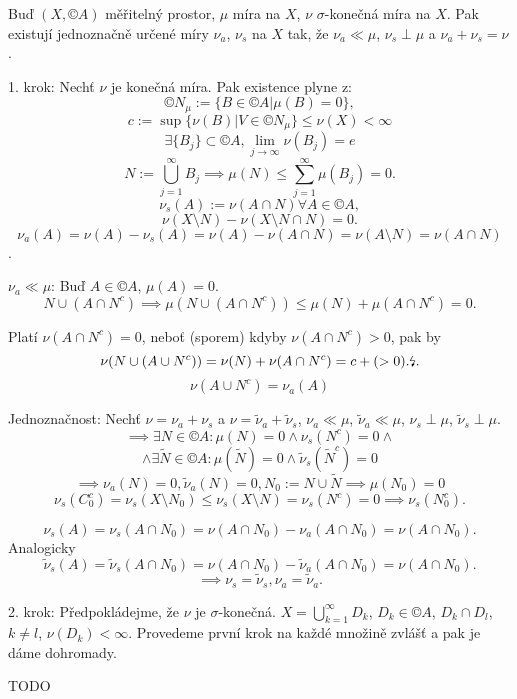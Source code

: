 \documentclass[12pt]{article}					%
\begin{document}
\begin{veta}
	Buď $(X, ©A)$ měřitelný prostor, $\mu$ míra na $X$, $\nu$ $\sigma$-konečná míra na $X$. Pak existují jednoznačně určené míry $\nu_a$, $\nu_s$ na $X$ tak, že $\nu_a \ll \mu$, $\nu_s \perp \mu$ a $\nu_a + \nu_s = \nu$.

	\begin{dukazin}
		1. krok: Nechť $\nu$ je konečná míra. Pak existence plyne z:
		$$ ©N_\mu := \{B \in ©A | \mu(B) = 0\}, $$
		$$ c := \sup\{\nu(B) | V \in ©N_\mu\} ≤ \nu(X) < ∞ $$
		$$ \exists \{B_j\} \subset ©A, \lim_{j \rightarrow ∞} \nu(B_j) = e $$
		$$ N := \bigcup_{j=1}^∞ B_j \implies \mu(N) ≤ \sum_{j=1}^∞ \mu(B_j) = 0. $$
		$$ \nu_s(A) := \nu(A \cap N) \forall A \in ©A, $$
		$$ \nu(X \setminus N) - \nu(X \setminus N \cap N) = 0. $$
		$$ \nu_a(A) = \nu(A) - \nu_s(A) = \nu(A) - \nu(A \cap N) = \nu(A \setminus N) = \nu(A \cap N) $$.

		$\nu_a \ll \mu$: Buď $A \in ©A$, $\mu(A) = 0$.
		$$ N \cup (A \cap N^c) \implies \mu(N \cup (A \cap N^c)) ≤ \mu(N) + \mu(A \cap N^c) = 0. $$

		Platí $\nu(A \cap N^c) = 0$, neboť (sporem) kdyby $\nu(A \cap N^c) > 0$, pak by
		$$ \nu(N \cup (A \cup N^c)) = \nu(N) + \nu(A \cap N^c) = c + (>0). \text{\lightning}. $$
		$$ \nu(A \cup N^c) = \nu_a(A) $$

		Jednoznačnost: Nechť $\nu = \nu_a + \nu_s$ a $\nu = \tilde \nu_a + \tilde \nu_s$, $\nu_a \ll \mu$, $\tilde \nu_a \ll \mu$, $\nu_s \perp \mu$, $\tilde \nu_s \perp \mu$.
		$$  \implies \exists N \in ©A: \mu(N) = 0 \land \nu_s(N^c) = 0 \land $$
		$$ \land \exists \tilde N \in ©A: \mu(\tilde N) = 0 \land \tilde\nu_s(\tilde N^c) = 0 $$
		$$ \implies \nu_a(N) = 0, \tilde \nu_a(N) = 0, N_0 := N \cup \tilde N \implies \mu(N_0) = 0 $$
		$$ \nu_s(C_0^c) = \nu_s(X \setminus N_0) ≤ \nu_s(X \setminus N) = \nu_s(N^c) = 0 \implies \nu_s(N_0^c). $$

		$$ \nu_s(A) = \nu_s(A \cap N_0) = \nu(A \cap N_0) - \nu_a(A \cap N_0) = \nu(A \cap N_0). $$
		Analogicky
		$$ \tilde \nu_s(A) = \tilde \nu_s(A \cap N_0) = \nu(A \cap N_0) - \tilde \nu_a(A \cap N_0) = \nu(A \cap N_0). $$
		$$ \implies \nu_s = \tilde \nu_s, \nu_a = \tilde \nu_a. $$

		2. krok: Předpokládejme, že $\nu$ je $\sigma$-konečná. $X = \bigcup_{k=1}^∞ D_k$, $D_k \in ©A$, $D_k \cap D_l$, $k ≠ l$, $\nu(D_k) < ∞$. Provedeme první krok na každé množině zvlášť a pak je dáme dohromady.


		TODO
	\end{dukazin}
\end{veta}
\end{document}
